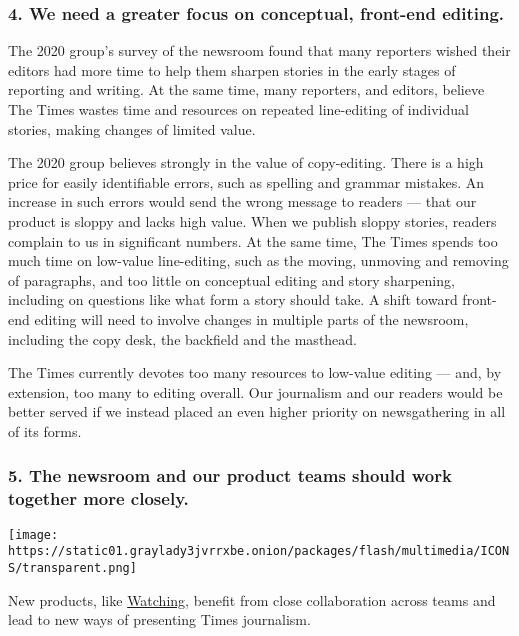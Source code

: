 \hypertarget{4-we-need-a-greater-focus-on-conceptual-front-end-editing}{%
\subsubsection{4. We need a greater focus on conceptual, front-end
editing.}\label{4-we-need-a-greater-focus-on-conceptual-front-end-editing}}

The 2020 group's survey of the newsroom found that many reporters wished
their editors had more time to help them sharpen stories in the early
stages of reporting and writing. At the same time, many reporters, and
editors, believe The Times wastes time and resources on repeated
line-editing of individual stories, making changes of limited value.

The 2020 group believes strongly in the value of copy-editing. There is
a high price for easily identifiable errors, such as spelling and
grammar mistakes. An increase in such errors would send the wrong
message to readers --- that our product is sloppy and lacks high value.
When we publish sloppy stories, readers complain to us in significant
numbers. At the same time, The Times spends too much time on low-value
line-editing, such as the moving, unmoving and removing of paragraphs,
and too little on conceptual editing and story sharpening, including on
questions like what form a story should take. A shift toward front-end
editing will need to involve changes in multiple parts of the newsroom,
including the copy desk, the backfield and the masthead.

The Times currently devotes too many resources to low-value editing ---
and, by extension, too many to editing overall. Our journalism and our
readers would be better served if we instead placed an even higher
priority on newsgathering in all of its forms.

\hypertarget{5-the-newsroom-and-our-product-teams-should-work-together-more-closely}{%
\subsubsection{5. The newsroom and our product teams should work
together more
closely.}\label{5-the-newsroom-and-our-product-teams-should-work-together-more-closely}}

\texttt{[image: https://static01.graylady3jvrrxbe.onion/packages/flash/multimedia/ICONS/transparent.png]}

New products, like
\href{https://www.nytimes3xbfgragh.onion/watching}{Watching}, benefit
from close collaboration across teams and lead to new ways of presenting
Times journalism.

